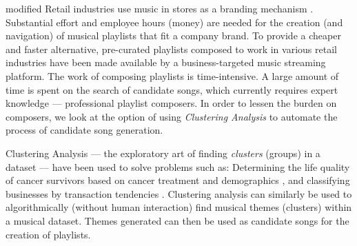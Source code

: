 \documentclass[../report.tex]{subfiles}
\begin{document}
\begin{color}{modified}
  Retail industries use music in stores as a branding mechanism \cite{gustafsson}. Substantial effort and employee hours (money) are needed for the creation (and navigation) of musical playlists that fit a company brand. To provide a cheaper and faster alternative, pre-curated playlists composed to work in various retail industries have been made available by a business-targeted music streaming platform. The work of composing playlists is time-intensive. A large amount of time is spent on the search of candidate songs, which currently requires expert knowledge --- professional playlist composers. In order to lessen the burden on composers, we look at the option of using \textit{Clustering Analysis} to automate the process of candidate song generation.




Clustering Analysis --- the exploratory art of finding \textit{clusters} (groups) in a dataset \cite{Kaufman1990} --- have been used to solve problems such as: Determining the life quality of cancer survivors based on cancer treatment and demographics \cite{medical}, and classifying businesses by transaction tendencies \cite{Jing2007}. Clustering analysis can similarly be used to algorithmically (without human interaction) find musical themes (clusters) within a musical dataset. Themes generated can then be used as candidate songs for the creation of playlists.



\end{color}
\end{document}
